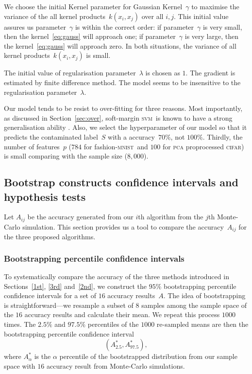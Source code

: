 \documentclass[12pt]{article} %
\newcommand{\svm}{\textsc{svm}}
\newcommand{\mnist}{fashion-\textsc{mnist}}
\begin{document}
We choose the initial Kernel parameter for Gaussian Kernel~$\gamma$  to maximise the variance of the all kernel products~$k(x_i,x_j)$ over all $i,j$. 
This initial value assures us parameter~$\gamma$ is within the correct order: if parameter~$\gamma$ is very small, then the kernel~\eqref{eq:gauss} will approach one; if parameter~$\gamma$ is very large, then the kernel~\eqref{eq:gauss} will approach zero. In both situations, the variance of all kernel products~$k(x_i,x_j)$ is small.

The initial value of regularisation parameter~$\lambda$ is chosen as $1$.
The gradient is estimated by finite difference method.
The model seems to be insensitive to the regularisation parameter~$\lambda$.

Our model tends to be resist to over-fitting for three reasons. Most importantly, as discussed in Section~\ref{sec:over}, soft-margin \svm\ is known to have a strong generalisation ability \citep{NIPS2012_4500,Cortes1995,Seeger:2003:PGE:944919.944929}. Also, we select the hyperparameter of our model so that it predicts the contaminated label~$S$ with a accuracy~$70\%$, not $100\%$. Thirdly, the number of features~$p$ ($784$ for \mnist\ and $100$ for \textsc{pca} proprocessed \textsc{cifar}) is small comparing with the sample size ($8,000$).

\subsection{Bootstrap constructs confidence intervals and hypothesis tests}
Let $A_{ij}$ be the accuracy generated from our {$i$}th algorithm from the $j$th Monte-Carlo simulation. This section provides us a tool to compare the accuracy~$A_{ij}$ for the three proposed algorithms.
\subsubsection{Bootstrapping percentile confidence intervals}\label{ci}
To systematically compare the accuracy of the three methods introduced in Sections~\ref{1st}, \ref{3rd} and~\ref{2nd}, we construct the $95\%$ bootstrapping percentile confidence intervals for a set of $16$ accuracy results~$A$. The idea of bootstrapping  is straightforward---we resample a subset of $8$ samples among the sample space of the $16$ accuracy results and calculate their mean. We repeat this process $1000$ times. The $2.5\%$ and $97.5\%$ percentiles of the $1000$ re-sampled means are then the bootstrapping percentile confidence interval
\begin{equation}
({A}^*_{2.5}, {A}^*_{97.5}), \label{eq:boot}
\end{equation}
where $A^*_{\alpha}$ is the $\alpha$ percentile of the bootstrapped distribution from our sample space with $16$ accuracy result from Monte-Carlo simulations.
\end{document}
